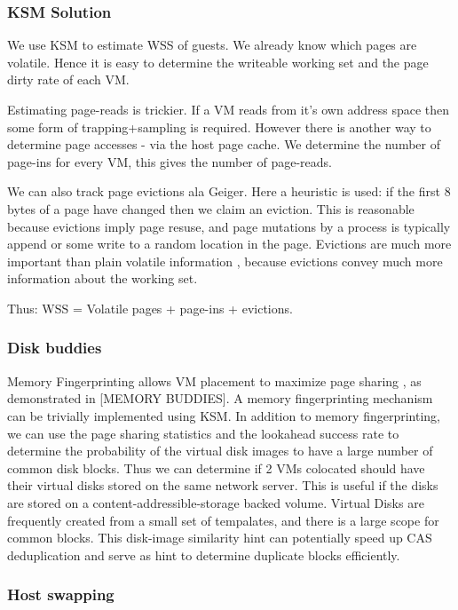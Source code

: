 \documentclass[10pt,a4paper]{article}
\begin{document}
\subsubsection{KSM Solution}
We use KSM to estimate WSS of guests. We already know which pages are volatile. Hence it is easy to determine the writeable working set and the page dirty rate of each VM.

Estimating page-reads is trickier. If a VM reads from it's own address space then some form of trapping+sampling is required. 
However there is another way to determine page accesses - via the host page cache. We determine the number of page-ins for every VM, this gives the number of page-reads. 

We can also track page evictions ala Geiger. Here a heuristic is used: if the first 8 bytes of a page have changed then we claim an eviction. This is reasonable because evictions imply page resuse, and page mutations by a process is typically append or some write to a random location in the page. Evictions are much more important than plain volatile information , because evictions convey much more information about the working set. 

Thus: WSS = Volatile pages + page-ins + evictions.

\subsubsection{Disk buddies}
Memory Fingerprinting allows VM placement to maximize page sharing , as demonstrated in [MEMORY BUDDIES]. A memory fingerprinting mechanism can be trivially implemented using KSM. 
In addition to memory fingerprinting, we can use the page sharing statistics and the lookahead success rate to determine the probability of the virtual disk images to have a large number of common disk blocks. Thus we can determine if 2 VMs colocated should have their virtual disks stored on the same network server. This is useful if the disks are stored on a content-addressible-storage backed volume. 
Virtual Disks are frequently created from a small set of tempalates, and there is a large scope for common blocks. This disk-image similarity hint can potentially speed up CAS deduplication and serve as hint to determine duplicate blocks efficiently. 

\subsubsection{Host swapping}
\end{document}
